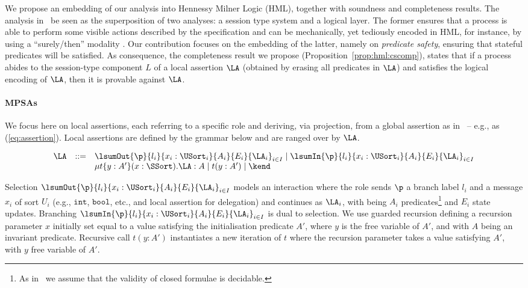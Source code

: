 
 We propose an embedding of our analysis
into Hennessy Milner Logic (HML), together with soundness and
completeness results. The analysis in~\cite{BDY12} be seen as the
superposition of two analyses: a session type system and a logical
layer. The former ensures that a process is able to perform some
visible actions described by the specification and can be
mechanically, yet tediously encoded in HML, for instance, by using a
``surely/then'' modality \cite{DBLP:conf/icalp/BergerHY08}.  Our
contribution focuses on the embedding of the latter, namely on
\emph{predicate safety}, ensuring that stateful predicates will be
satisfied.  As consequence, the completeness result we propose
(Proposition~\ref{prop:hml:cscomp}), states that if a process abides
to the session-type component $L$ of a local assertion $\LA$ (obtained by
erasing all predicates in $\LA$) and satisfies the logical encoding of
$\LA$, then it is provable against $\LA$.

\paragraph{MPSAs} We focus here on local assertions, 
each referring to a specific role and deriving, via projection, from a
global assertion as in~\cite{BDY12} -- e.g., as (\ref{eq:assertion}).
Local assertions are defined by the grammar below and are ranged over
by $\LA$.

 {\small
$$
\begin{array}{lll} 
\LA & ::= & 
\lsumOut{\p}{l_i}{x_i:\USort_i}{A_i}{E_i}{\LA_i}_{i \in I}  
\mid
\lsumIn{\p}{l_i}{x_i:\USort_i}{A_i}{E_i}{\LA_i}_{i \in I}
\\
&& \mu t\{y:A'\}(x:\SSort).\LA:A 
\mid
t(y:A') 
\mid
\kend  
\end{array}
$$
}
 
Selection $\lsumOut{\p}{l_i}{x_i:\USort_i}{A_i}{E_i}{\LA_i}_{i \in I}$
models an interaction where the role sends $\p$ a branch label $l_i$
and a message $x_i$ of sort $U_i$ (e.g., $\mathtt{int}$,
$\mathtt{bool}$, etc., and local assertion for delegation) and continues as $\LA_i$, with being $A_{i}$
predicates\footnote{As in~\cite{BHTY10,BDY12} we assume that the
  validity of closed formulae is decidable.} and $E_{i}$ state
updates. Branching $\lsumIn{\p}{l_i}{x_i:\USort_i}{A_i}{E_i}{\LA_i}_{i \in I}$ is dual to selection. 
We use guarded recursion defining a recursion parameter $x$ initially set equal to a value satisfying the initialisation predicate $A'$, 
where $y$ is the free variable of $A'$, and with $A$ being an invariant predicate. 
Recursive call $t(y:A')$ instantiates a new iteration of $t$ where the recursion parameter takes a value satisfying $A'$, with $y$ free variable of $A'$. 

